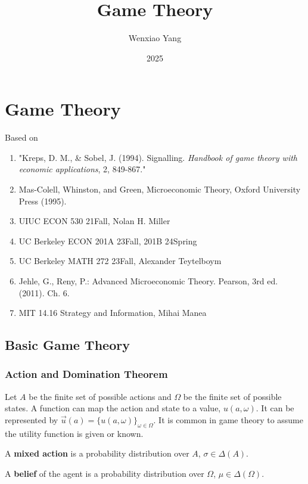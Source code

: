 \documentclass[11pt]{elegantbook_2}
\title{Game Theory}
\author{Wenxiao Yang}
\institute{Haas School of Business, University of California Berkeley}
\date{2025}
\begin{document}
\maketitle

\frontmatter
\tableofcontents

\mainmatter




\chapter{Game Theory}
Based on
\begin{enumerate}[$\circ$]
    \item "Kreps, D. M., \& Sobel, J. (1994). Signalling. \textit{Handbook of game theory with economic applications}, 2, 849-867."
    \item Mas-Colell, Whinston, and Green, Microeconomic Theory, Oxford University Press (1995).
    \item UIUC ECON 530 21Fall, Nolan H. Miller
    \item UC Berkeley ECON 201A 23Fall, 201B 24Spring
    \item UC Berkeley MATH 272 23Fall, Alexander Teytelboym
    \item  Jehle, G., Reny, P.: Advanced Microeconomic Theory. Pearson, 3rd ed. (2011). Ch. 6.
    \item MIT 14.16 Strategy and Information, Mihai Manea
\end{enumerate}



\section{Basic Game Theory}
\subsection{Action and Domination Theorem}
Let $A$ be the finite set of possible actions and $\Omega$ be the finite set of possible states. A function can map the action and state to a value, $u(a,\omega)$. It can be represented by $\vec{u}(a)=\{u(a,\omega)\}_{\omega\in\Omega}$. It is common in game theory to assume the utility function is given or known.

A \textbf{mixed action} is a probability distribution over $A$, $\sigma\in\Delta(A)$.

A \textbf{belief} of the agent is a probability distribution over $\Omega$, $\mu\in\Delta(\Omega)$.
\end{document}
